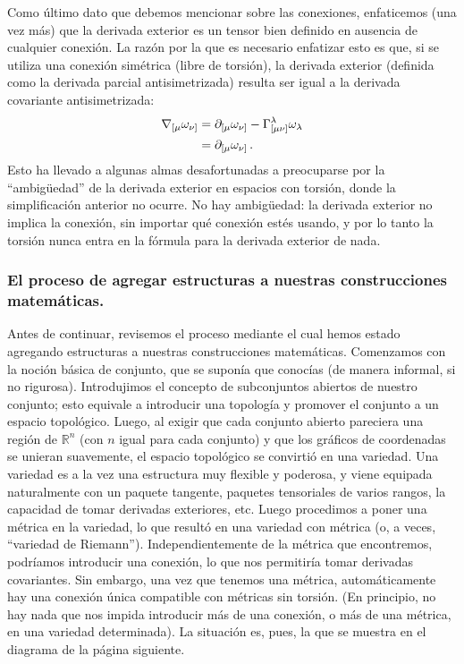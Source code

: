 \documentclass[11pt,b5paper,openany,twoside]{book}
\newcommand{\mn}{{\mu\nu}}
\newcommand{\p}[1]{{\partial_{#1}}}
\newcommand{\R}{\mathbb{R}}
\begin{document}
Como último dato que debemos mencionar sobre las conexiones, enfaticemos (una vez más) que la derivada exterior es un tensor bien definido en ausencia de cualquier conexión.
La razón por la que es necesario enfatizar esto es que, si se utiliza una conexión simétrica (libre de torsión), la derivada exterior (definida como la derivada parcial antisimetrizada) resulta ser igual a la derivada covariante antisimetrizada:
\begin{align}
\nabla_{[\mu}\omega_{\nu]} &=  \p{[\mu}\omega_{\nu]}
-\Gamma^\lambda_{[\mn]}\omega_\lambda  \notag \\
&=  \p{[\mu}\omega_{\nu]}\,. \label{3.29}
\end{align}
Esto ha llevado a algunas almas desafortunadas a preocuparse por la ``ambigüedad'' de la derivada exterior en espacios con torsión, donde la simplificación anterior no ocurre.
No hay ambigüedad: la derivada exterior no implica la conexión, sin importar qué conexión estés usando, y por lo tanto la torsión nunca entra en la fórmula para la derivada exterior de nada.

\subsubsection{El proceso de agregar estructuras a nuestras construcciones matemáticas.}

Antes de continuar, revisemos el proceso mediante el cual hemos estado agregando estructuras a nuestras construcciones matemáticas.
Comenzamos con la noción básica de conjunto, que se suponía que conocías (de manera informal, si no rigurosa).
Introdujimos el concepto de subconjuntos abiertos de nuestro conjunto; esto equivale a introducir una topología y promover el conjunto a un espacio topológico.
Luego, al exigir que cada conjunto abierto pareciera una región de $\R^n$ (con $n$ igual para cada conjunto) y que los gráficos de coordenadas se unieran suavemente, el espacio topológico se convirtió en una variedad.
Una variedad es a la vez una estructura muy flexible y poderosa, y viene equipada naturalmente con un paquete tangente, paquetes tensoriales de varios rangos, la capacidad de tomar derivadas exteriores, etc.
Luego procedimos a poner una métrica en la variedad, lo que resultó en una variedad con métrica (o, a veces, ``variedad de Riemann'').
Independientemente de la métrica que encontremos, podríamos introducir una conexión, lo que nos permitiría tomar derivadas covariantes.
Sin embargo, una vez que tenemos una métrica, automáticamente hay una conexión única compatible con métricas sin torsión.
(En principio, no hay nada que nos impida introducir más de una conexión, o más de una métrica, en una variedad determinada).
La situación es, pues, la que se muestra en el diagrama de la página siguiente.
\end{document}
